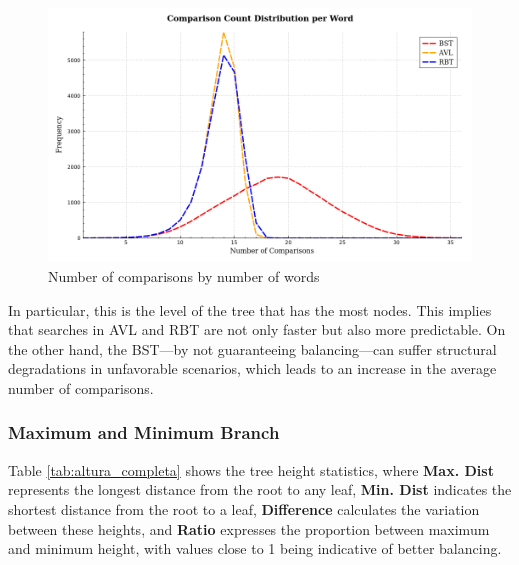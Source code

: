  \begin{figure}[H]
     \centering
     \includegraphics[width=0.8\linewidth]{img/Graph_6_20273.pdf}
     \caption{Number of comparisons by number of words}
     \label{fig:comparacoes}
 \end{figure}


 In particular, this is the level of the tree that has the most nodes. This implies that searches in AVL and RBT are not only faster but also more predictable.
 On the other hand, the BST—by not guaranteeing balancing—can suffer structural degradations in unfavorable scenarios, which leads to an increase in the average number of comparisons.

 \subsubsection{Maximum and Minimum Branch}

 Table \ref{tab:altura_completa} shows the tree height statistics,
 where \textbf{Max. Dist} represents the longest distance from the root to any leaf,
 \textbf{Min. Dist} indicates the shortest distance from the root to a leaf, \textbf{Difference}
 calculates the variation between these heights, and \textbf{Ratio} expresses the proportion between maximum
 and minimum height, with values close to 1 being indicative of better balancing.

